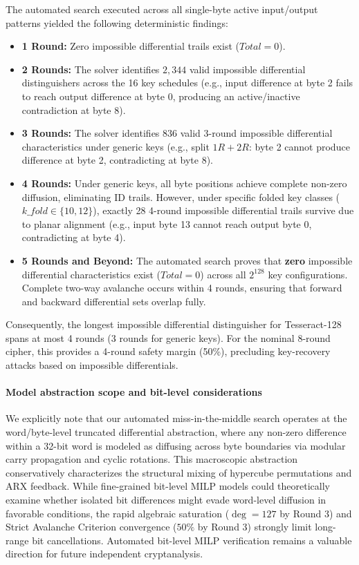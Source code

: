 \documentclass[10pt,twocolumn]{article}
\begin{document}
The automated search executed across all single-byte active input/output patterns yielded the following deterministic findings:
\begin{itemize}
    \item \textbf{1 Round:} Zero impossible differential trails exist ($Total = 0$).
    \item \textbf{2 Rounds:} The solver identifies $2{,}344$ valid impossible differential distinguishers across the 16 key schedules (e.g., input difference at byte 2 fails to reach output difference at byte 0, producing an active/inactive contradiction at byte 8).
    \item \textbf{3 Rounds:} The solver identifies $836$ valid 3-round impossible differential characteristics under generic keys (e.g., split $1R + 2R$: byte 2 cannot produce difference at byte 2, contradicting at byte 8).
    \item \textbf{4 Rounds:} Under generic keys, all byte positions achieve complete non-zero diffusion, eliminating ID trails. However, under specific folded key classes ($\mathit{k\_fold} \in \{10, 12\}$), exactly 28 4-round impossible differential trails survive due to planar alignment (e.g., input byte 13 cannot reach output byte 0, contradicting at byte 4).
    \item \textbf{5 Rounds and Beyond:} The automated search proves that \textbf{zero} impossible differential characteristics exist ($Total = 0$) across all $2^{128}$ key configurations. Complete two-way avalanche occurs within 4 rounds, ensuring that forward and backward differential sets overlap fully.
\end{itemize}
Consequently, the longest impossible differential distinguisher for Tesseract-128 spans at most 4 rounds (3 rounds for generic keys). For the nominal 8-round cipher, this provides a 4-round safety margin (50\%), precluding key-recovery attacks based on impossible differentials.

\paragraph{Model abstraction scope and bit-level considerations}
We explicitly note that our automated miss-in-the-middle search operates at the word/byte-level truncated differential abstraction, where any non-zero difference within a 32-bit word is modeled as diffusing across byte boundaries via modular carry propagation and cyclic rotations. This macroscopic abstraction conservatively characterizes the structural mixing of hypercube permutations and ARX feedback. While fine-grained bit-level MILP models could theoretically examine whether isolated bit differences might evade word-level diffusion in favorable conditions, the rapid algebraic saturation ($\deg = 127$ by Round 3) and Strict Avalanche Criterion convergence ($50\%$ by Round 3) strongly limit long-range bit cancellations. Automated bit-level MILP verification remains a valuable direction for future independent cryptanalysis.
\end{document}
